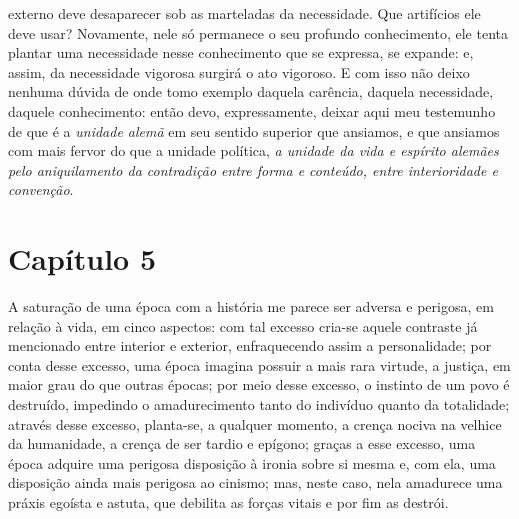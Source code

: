     externo deve desaparecer sob as marteladas da necessidade. Que
    artifícios ele deve usar? Novamente, nele só permanece o seu
    profundo conhecimento, ele tenta plantar uma necessidade nesse
    conhecimento que se expressa, se expande: e, assim, da necessidade
    vigorosa surgirá o ato vigoroso. E com isso não deixo nenhuma dúvida
    de onde tomo exemplo daquela carência, daquela necessidade, daquele
    conhecimento: então devo, expressamente, deixar aqui meu testemunho
    de que é a \emph{unidade alemã} em seu sentido superior que
    ansiamos, e que ansiamos com mais fervor do que a unidade política,
    \emph{a unidade da vida e espírito alemães pelo aniquilamento da
    contradição entre forma e conteúdo, entre interioridade e
    convenção}.

  \chapter{Capítulo 5}\label{capítulo-5}


A saturação de uma época com a história me parece ser adversa e perigosa,
em relação à vida, em cinco aspectos: com tal excesso cria-se aquele
contraste já mencionado entre interior e exterior, enfraquecendo assim a
personalidade; por conta desse excesso, uma época imagina possuir a mais
rara virtude, a justiça, em maior grau do que outras épocas; por meio
desse excesso, o instinto de um povo é destruído, impedindo o
amadurecimento tanto do indivíduo quanto da totalidade; através desse
excesso, planta-se, a qualquer momento, a crença nociva na velhice da
humanidade, a crença de ser tardio e epígono; graças a esse excesso, uma
época adquire uma perigosa disposição à ironia sobre si mesma e, com
ela, uma disposição ainda mais perigosa ao cinismo; mas, neste caso,
nela amadurece uma práxis egoísta e astuta, que debilita as forças
vitais e por fim as destrói.

